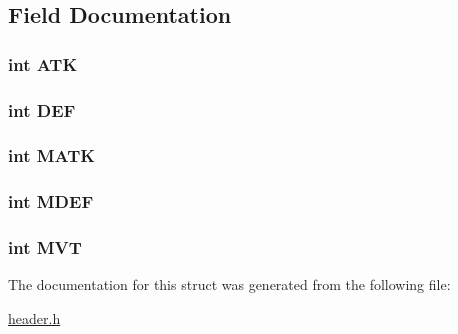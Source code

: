 \subsection{Field Documentation}
\hypertarget{structt__stats_a3b3918526788ae6b163c41dc25326396}{
\subsubsection[{A\-T\-K}]{\setlength{\rightskip}{0pt plus 5cm}int A\-T\-K}}\label{structt__stats_a3b3918526788ae6b163c41dc25326396}
\hypertarget{structt__stats_a30707041436614e9e3759b7bf533b201}{
\subsubsection[{D\-E\-F}]{\setlength{\rightskip}{0pt plus 5cm}int D\-E\-F}}\label{structt__stats_a30707041436614e9e3759b7bf533b201}
\hypertarget{structt__stats_ae183b98dc9aca9905f531bfd4dd51a1c}{
\subsubsection[{M\-A\-T\-K}]{\setlength{\rightskip}{0pt plus 5cm}int M\-A\-T\-K}}\label{structt__stats_ae183b98dc9aca9905f531bfd4dd51a1c}
\hypertarget{structt__stats_a92ab6d75a95ed209b7875314f53fb555}{
\subsubsection[{M\-D\-E\-F}]{\setlength{\rightskip}{0pt plus 5cm}int M\-D\-E\-F}}\label{structt__stats_a92ab6d75a95ed209b7875314f53fb555}
\hypertarget{structt__stats_a397f7940443939415a50f324dc5f56f9}{
\subsubsection[{M\-V\-T}]{\setlength{\rightskip}{0pt plus 5cm}int M\-V\-T}}\label{structt__stats_a397f7940443939415a50f324dc5f56f9}


The documentation for this struct was generated from the following file\-:\begin{DoxyCompactItemize}
\item 
\hyperlink{header_8h}{header.\-h}\end{DoxyCompactItemize}
